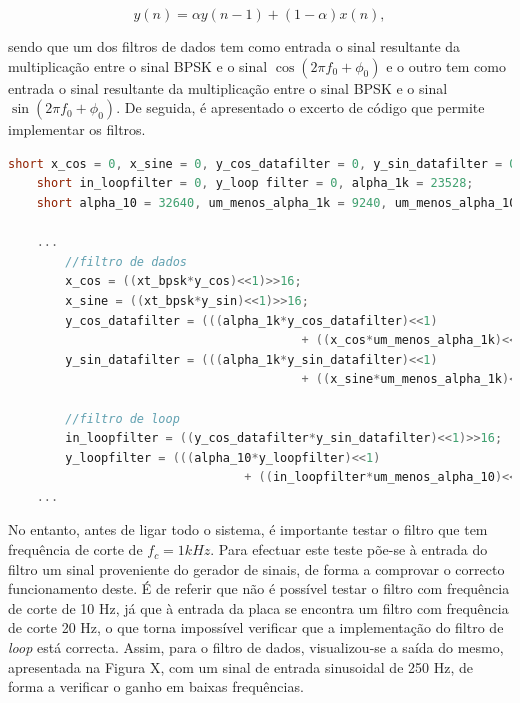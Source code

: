 \documentclass[11pt]{article}
\numberwithin{equation}{section}
\begin{document}
\vspace{-3mm}
\begin{equation}
y(n) = \alpha y(n-1) +  (1-\alpha)x(n),
\end{equation} 

\vspace{1mm}
sendo que um dos filtros de dados tem como entrada o sinal resultante da multiplicação entre o sinal BPSK e o sinal $\cos(2\pi f_0 + \phi_0)$ e o outro tem como entrada o sinal resultante da multiplicação entre o sinal BPSK e o sinal $\sin(2\pi f_0 + \phi_0)$. De seguida, é apresentado o excerto de código que permite implementar os filtros. 

\begin{lstlisting}[language=C]
	short x_cos = 0, x_sine = 0, y_cos_datafilter = 0, y_sin_datafilter = 0;  
	short in_loopfilter = 0, y_loop filter = 0, alpha_1k = 23528; 
	short alpha_10 = 32640, um_menos_alpha_1k = 9240, um_menos_alpha_10 = 127;

	...
		//filtro de dados
		x_cos = ((xt_bpsk*y_cos)<<1)>>16;
		x_sine = ((xt_bpsk*y_sin)<<1)>>16;
		y_cos_datafilter = (((alpha_1k*y_cos_datafilter)<<1)
										 + ((x_cos*um_menos_alpha_1k)<<1))>>16;
		y_sin_datafilter = (((alpha_1k*y_sin_datafilter)<<1)
										 + ((x_sine*um_menos_alpha_1k)<<1))>>16;
	
		//filtro de loop
		in_loopfilter = ((y_cos_datafilter*y_sin_datafilter)<<1)>>16;
		y_loopfilter = (((alpha_10*y_loopfilter)<<1) 
								 + ((in_loopfilter*um_menos_alpha_10)<<1))>>16;
	...
\end{lstlisting}

No entanto, antes de ligar todo o sistema, é importante testar o filtro que tem frequência de corte de $f_c = 1 kHz$. Para efectuar este teste põe-se à entrada do filtro um sinal proveniente do gerador de sinais, de forma a comprovar o correcto funcionamento deste. É de referir que não é possível testar o filtro com frequência de corte de 10 Hz, já que à entrada da placa se encontra um filtro com frequência de corte 20 Hz, o que torna impossível verificar que a implementação do filtro de \textit{loop} está correcta. Assim, para o filtro de dados, visualizou-se a saída do mesmo, apresentada na Figura X, com um sinal de entrada sinusoidal de 250 Hz, de forma a verificar o ganho em baixas frequências.
\end{document}
